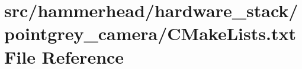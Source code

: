 \hypertarget{hardware__stack_2pointgrey__camera_2CMakeLists_8txt}{}\section{src/hammerhead/hardware\+\_\+stack/pointgrey\+\_\+camera/\+C\+Make\+Lists.txt File Reference}
\label{hardware__stack_2pointgrey__camera_2CMakeLists_8txt}
